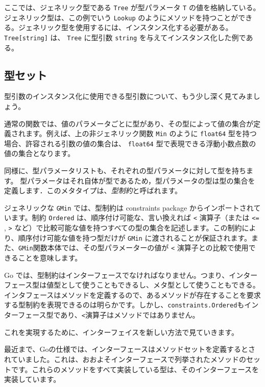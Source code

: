 ここでは、ジェネリック型である \texttt{Tree} が型パラメータ \texttt{T}
の値を格納している。 ジェネリック型は、この例でいう \texttt{Lookup}
のようにメソッドを持つことができる。ジェネリック型を使用するには、インスタンス化する必要がある。
\texttt{Tree{[}string{]}} は、 \texttt{Tree} に型引数 \texttt{string}
を与えてインスタンス化した例である。

\subsection{型セット}

型引数のインスタンス化に使用できる型引数について、もう少し深く見てみましょう。

通常の関数では、値のパラメータごとに型があり、その型によって値の集合が定義されます。例えば、上の非ジェネリック関数
\texttt{Min} のように \texttt{float64}
型を持つ場合、許容される引数の値の集合は、 \texttt{float64}
型で表現できる浮動小数点数の値の集合となります。

同様に、型パラメータリストも、それぞれの型パラメータに対して型を持ちます。
型パラメータはそれ自体が型であるため，型パラメータの型は型の集合を定義します．このメタタイプは、\emph{型制約}と呼ばれます。

ジェネリックな \texttt{GMin} では、型制約は constraints package
からインポートされています。制約 \texttt{Ordered}
は、順序付け可能な、言い換えれば \texttt{\textless{}} 演算子（または
\texttt{\textless{}=} , \texttt{\textgreater{}}
など）で比較可能な値を持つすべての型の集合を記述します。この制約により、順序付け可能な値を持つ型だけが
\texttt{GMin}
に渡されることが保証されます。また、\texttt{GMin}関数本体では、その型パラメーターの値が
\texttt{\textless{}} 演算子との比較で使用できることを意味します。

Go
では、型制約はインターフェースでなければなりません。つまり、インターフェース型は値型として使うこともできるし、メタ型として使うこともできる。
インタフェースはメソッドを定義するので、あるメソッドが存在することを要求する型制約を表現できるのは明らかです。しかし、\texttt{constraints.Ordered}もインターフェース型であり、\texttt{\textless{}}演算子はメソッドではありません。

これを実現するために、インターフェイスを新しい方法で見ていきます。

最近まで、Goの仕様では、インターフェースはメソッドセットを定義するとされていました。これは、おおよそインターフェースで列挙されたメソッドのセットです。これらのメソッドをすべて実装している型は、そのインターフェースを実装しています。

